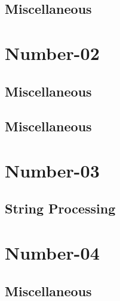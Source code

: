 \subsection{Miscellaneous}
\raggedbottom
\vspace{-.7\baselineskip}\hrulefill
\vspace{0.1\baselineskip}
\section{Number-02}
\subsection{Miscellaneous}
\raggedbottom
\vspace{-.7\baselineskip}\hrulefill
\vspace{0.1\baselineskip}\subsection{Miscellaneous}
\raggedbottom
\vspace{-.7\baselineskip}\hrulefill
\vspace{0.1\baselineskip}
\section{Number-03}
\subsection{String Processing}
\raggedbottom
\vspace{-.7\baselineskip}\hrulefill
\vspace{0.1\baselineskip}
\section{Number-04}
\subsection{Miscellaneous}
\raggedbottom
\vspace{-.7\baselineskip}\hrulefill
\vspace{0.1\baselineskip}
